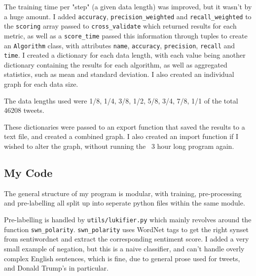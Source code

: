 \documentclass{article}
\begin{document}
The training time per "step" (a given data length) was improved, but it wasn't by a huge amount.
I added \lstinline{accuracy}, \lstinline{precision_weighted} and \lstinline{recall_weighted} to the \lstinline{scoring} array passed to \lstinline{cross_validate} which returned results for each metric, as well as a \lstinline{score_time} passed this information through tuples to create an \lstinline{Algorithm} class, with attributes \lstinline{name}, \lstinline{accuracy}, \lstinline{precision}, \lstinline{recall} and \lstinline{time}.
I created a dictionary for each data length, with each value being another dictionary containing the results for each algorithm, as well as aggregated statistics, such as mean and standard deviation.
I also created an individual graph for each data size.

The data lengths used were 1/8, 1/4, 3/8, 1/2, 5/8, 3/4, 7/8, 1/1 of the total 46208 tweets.

These dictionaries were passed to an export function that saved the results to a text file, and created a combined graph.
I also created an import function if I wished to alter the graph, without running the ~3 hour long program again.

\subsection{My Code}

The general structure of my program is modular, with training, pre-processing and pre-labelling all split up into seperate python files within the same module.

Pre-labelling is handled by \lstinline{utils/lukifier.py} which mainly revolves around the function \lstinline{swn_polarity}.
\lstinline{swn_polarity} uses WordNet tags to get the right synset from sentiwordnet and extract the corresponding sentiment score.
I added a very small example of negation, but this is a naive classifier, and can't handle overly complex English sentences, which is fine, due to general prose used for tweets, and Donald Trump's in particular.
\end{document}
